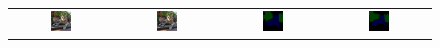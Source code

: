 \begin{figure}[ht]
\begin{tabular}{cccc}
    \includegraphics[width=0.22\textwidth]
    {figures/originals/2007_003778.jpg}
              &
    \includegraphics[width=0.22\textwidth]
    {figures/originals/2007_003778.jpg}
              &
    \includegraphics[width=0.22\textwidth]
    {figures/val_labels/weclip/2007_003778_[7, 15].png}
              &
    \includegraphics[width=0.22\textwidth]
    {figures/val_labels/ours/2007_003778_[7, 15].png}  \\


\end{tabular}
\end{figure}
